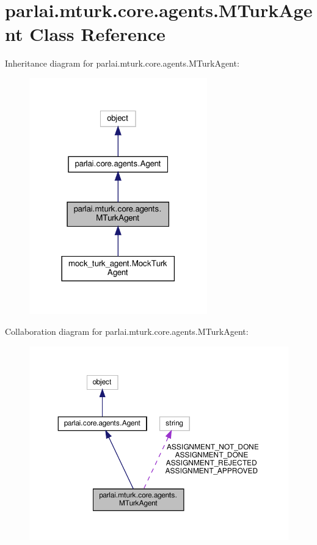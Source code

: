 \hypertarget{classparlai_1_1mturk_1_1core_1_1agents_1_1MTurkAgent}{}\section{parlai.\+mturk.\+core.\+agents.\+M\+Turk\+Agent Class Reference}
\label{classparlai_1_1mturk_1_1core_1_1agents_1_1MTurkAgent}


Inheritance diagram for parlai.\+mturk.\+core.\+agents.\+M\+Turk\+Agent\+:
\nopagebreak
\begin{figure}[H]
\begin{center}
\leavevmode
\includegraphics[width=218pt]{classparlai_1_1mturk_1_1core_1_1agents_1_1MTurkAgent__inherit__graph}
\end{center}
\end{figure}


Collaboration diagram for parlai.\+mturk.\+core.\+agents.\+M\+Turk\+Agent\+:
\nopagebreak
\begin{figure}[H]
\begin{center}
\leavevmode
\includegraphics[width=350pt]{classparlai_1_1mturk_1_1core_1_1agents_1_1MTurkAgent__coll__graph}
\end{center}
\end{figure}
